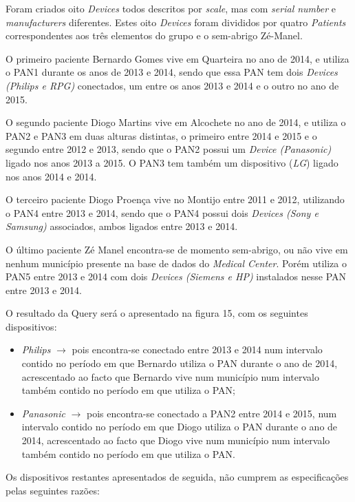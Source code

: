 \documentclass[a4paper]{article}
\begin{document}
	Foram criados oito \textit{Devices} todos descritos por \textit{scale}, mas com \textit{serial
	number} e \textit{manufacturers} diferentes. Estes oito \textit{Devices} foram divididos
	por quatro \textit{Patients} correspondentes aos três elementos do grupo e o sem-abrigo
	Zé-Manel.
	
	O primeiro paciente Bernardo Gomes vive em Quarteira no ano de 2014,
	e utiliza o PAN1 durante os anos de 2013 e 2014, sendo que essa PAN 
	tem dois \textit{Devices (Philips e RPG)} conectados, um entre os anos 2013 e
	2014 e o outro no ano de 2015.
	
	O segundo paciente Diogo Martins vive em Alcochete no ano de 2014, e
	utiliza o PAN2 e PAN3 em duas alturas distintas, o primeiro entre 2014
	e 2015 e o segundo entre 2012 e 2013, sendo que o PAN2 possui um \textit{Device 
	(Panasonic)} ligado nos anos 2013 a 2015. O PAN3 tem também um dispositivo
	(\textit{LG}) ligado nos anos 2014 e 2014.
	
	O terceiro paciente Diogo Proença vive no Montijo entre 2011 e 2012,
	utilizando o PAN4 entre 2013 e 2014, sendo que o PAN4 possui dois \textit{Devices
	(Sony e Samsung)} associados, ambos ligados entre 2013 e 2014.
	
	O último paciente Zé Manel encontra-se de momento sem-abrigo, ou não
	vive em nenhum município presente na base de dados do \textit{Medical Center}.
	Porém utiliza o PAN5 entre 2013 e 2014 com dois \textit{Devices (Siemens e HP)}
	instalados nesse PAN entre 2013 e 2014.
	
	O resultado da Query será o apresentado na figura 15, com os seguintes dispositivos:
	
	\begin{itemize}
	\item \textit{Philips} $\rightarrow$ pois encontra-se conectado entre 2013 e 2014 num intervalo
	contido no período em que Bernardo utiliza o PAN durante o ano de 2014,
	acrescentado ao facto que Bernardo vive num município num intervalo
	também contido no período em que utiliza o PAN;
	
	\item \textit{Panasonic} $\rightarrow$ pois encontra-se conectado a PAN2 entre 2014 e 2015, num
	intervalo contido no período em que Diogo utiliza o PAN durante o ano 
	de 2014, acrescentado ao facto que Diogo vive num município num intervalo
	também contido no período em que utiliza o PAN.
	\end{itemize}
	
	Os dispositivos restantes apresentados de seguida, não cumprem as especificações pelas seguintes razões:
	
\end{document}
